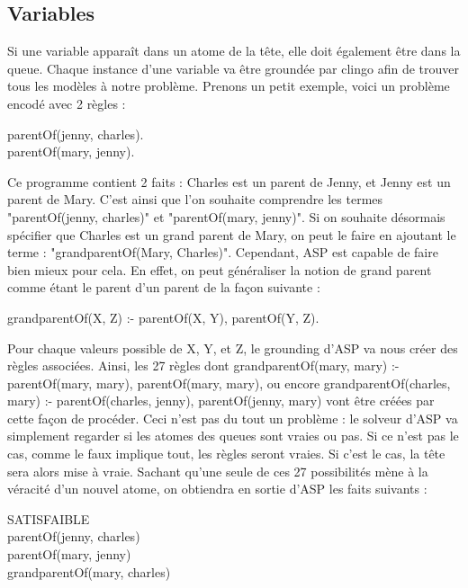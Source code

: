 \documentclass[12pt,a4paper]{article}
\begin{document}
\subsection{Variables}
Si une variable apparaît dans un atome de la tête, elle doit également être dans la queue. Chaque instance d'une variable va être groundée par clingo afin de trouver tous les modèles à notre problème.
Prenons un petit exemple, voici un problème encodé avec 2 règles :
\begin{center}
  parentOf(jenny, charles).\\
  parentOf(mary, jenny).
\end{center}
Ce programme contient 2 faits : Charles est un parent de Jenny, et Jenny est un parent de Mary. C'est ainsi que l'on souhaite comprendre les termes "parentOf(jenny, charles)" et "parentOf(mary, jenny)".
Si on souhaite désormais spécifier que Charles est un grand parent de Mary, on peut le faire en ajoutant le terme : "grandparentOf(Mary, Charles)". Cependant, ASP est capable de faire bien mieux pour cela.
En effet, on peut généraliser la notion de grand parent comme étant le parent d'un parent de la façon suivante :
\begin{center}
  grandparentOf(X, Z) :- parentOf(X, Y), parentOf(Y, Z).
\end{center}
Pour chaque valeurs possible de X, Y, et Z, le grounding d'ASP va nous créer des règles associées.
Ainsi, les 27 règles dont grandparentOf(mary, mary) :- parentOf(mary, mary), parentOf(mary, mary), ou encore grandparentOf(charles, mary) :- parentOf(charles, jenny), parentOf(jenny, mary) vont être créées 
par cette façon de procéder. Ceci n'est pas du tout un problème : le solveur d'ASP va simplement regarder si les atomes des queues sont vraies ou pas. Si ce n'est pas le cas, comme le faux implique tout, 
les règles seront vraies. Si c'est le cas, la tête sera alors mise à vraie. Sachant qu'une seule de ces 27 possibilités mène à la véracité d'un nouvel atome, on obtiendra en sortie d'ASP les faits suivants :
\begin{center}
  SATISFAIBLE\\
  parentOf(jenny, charles)\\
  parentOf(mary, jenny)\\
  grandparentOf(mary, charles)
\end{center}
\end{document}
